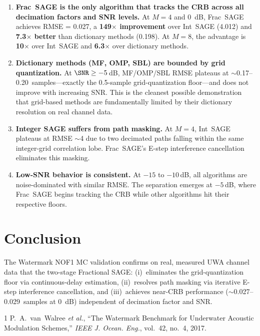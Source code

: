 \documentclass[11pt,a4paper]{article}
\begin{document}
\begin{enumerate}
\item \textbf{Frac~SAGE is the only algorithm that tracks the CRB across all decimation factors and SNR levels.} At $M=4$ and \SI{0}{dB}, Frac~SAGE achieves RMSE = 0.027, a \textbf{149$\times$ improvement} over Int~SAGE (4.012) and \textbf{7.3$\times$ better} than dictionary methods (0.198). At $M=8$, the advantage is \textbf{10$\times$} over Int~SAGE and \textbf{6.3$\times$} over dictionary methods.

\item \textbf{Dictionary methods (MF, OMP, SBL) are bounded by grid quantization.} At $\SNR \ge -5$\,dB, MF/OMP/SBL RMSE plateaus at $\sim$0.17--0.20~samples---exactly the 0.5-sample grid-quantization floor---and does not improve with increasing SNR. This is the cleanest possible demonstration that grid-based methods are fundamentally limited by their dictionary resolution on real channel data.

\item \textbf{Integer SAGE suffers from path masking.} At $M=4$, Int~SAGE plateaus at RMSE $\sim$4 due to two decimated paths falling within the same integer-grid correlation lobe. Frac~SAGE's E-step interference cancellation eliminates this masking.

\item \textbf{Low-SNR behavior is consistent.} At $-15$ to $-10$\,dB, all algorithms are noise-dominated with similar RMSE. The separation emerges at $-5$\,dB, where Frac~SAGE begins tracking the CRB while other algorithms hit their respective floors.
\end{enumerate}

\section{Conclusion}

The Watermark NOF1 MC validation confirms on real, measured UWA channel data that the two-stage Fractional SAGE: (i)~eliminates the grid-quantization floor via continuous-delay estimation, (ii)~resolves path masking via iterative E-step interference cancellation, and (iii)~achieves near-CRB performance ($\sim$0.027--0.029~samples at \SI{0}{dB}) independent of decimation factor and SNR.

\begin{thebibliography}{1}
P.~A.~van~Walree \textit{et al.}, ``The Watermark Benchmark for Underwater Acoustic Modulation Schemes,'' \textit{IEEE J. Ocean. Eng.}, vol.~42, no.~4, 2017.
\end{thebibliography}
\end{document}
